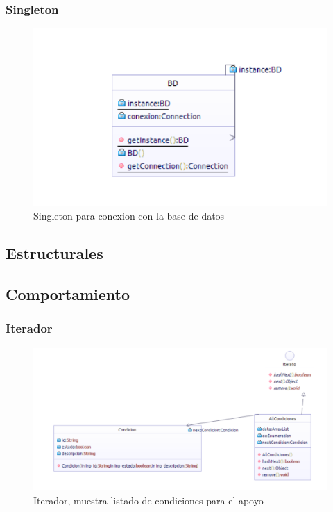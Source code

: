 \subsubsection{Singleton}
\begin{figure}[th!]
	\centering
	\includegraphics[width=1.2\linewidth]{uml/Patrones/Singleton}
	\caption{Singleton para conexion con la base de datos}
	\label{fig:Singleton}
\end{figure}

\clearpage



\newpage

\subsection{Estructurales}

\newpage

\subsection{Comportamiento}

\subsubsection{Iterador}
\begin{figure}[th!]
	\centering
	\includegraphics[width=1.2\linewidth]{uml/Patrones/Iterador}
	\caption{Iterador, muestra listado de condiciones para el apoyo}
	\label{fig:Iterador}
\end{figure}

\clearpage






